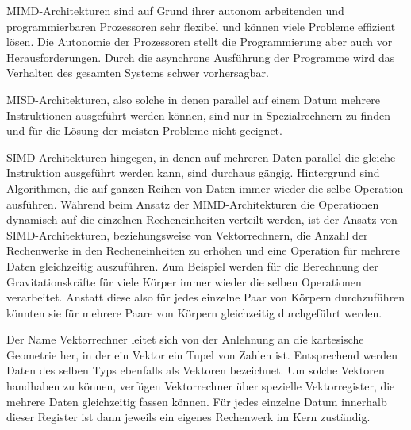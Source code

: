       MIMD-Architekturen sind auf Grund ihrer autonom arbeitenden und programmierbaren Prozessoren sehr flexibel und können viele Probleme effizient lösen. Die Autonomie der Prozessoren
      stellt die Programmierung aber auch vor Herausforderungen. Durch die asynchrone Ausführung der Programme wird das Verhalten des gesamten Systems schwer vorhersagbar.\citep{hpcskript}
      
      MISD-Architekturen, also solche in denen parallel auf einem Datum mehrere Instruktionen ausgeführt werden können, sind nur in Spezialrechnern zu finden und für die Lösung der meisten
      Probleme nicht geeignet. \citep{architect, korbler}
      
      SIMD-Architekturen hingegen, in denen auf mehreren Daten parallel die gleiche Instruktion ausgeführt werden kann, sind durchaus gängig.
      Hintergrund sind Algorithmen, die auf ganzen Reihen von Daten immer wieder die selbe Operation ausführen. Während beim Ansatz der MIMD-Architekturen die Operationen dynamisch auf die
      einzelnen Recheneinheiten verteilt werden, ist der Ansatz von SIMD-Architekturen, beziehungsweise von Vektorrechnern, die Anzahl der Rechenwerke in den Recheneinheiten zu erhöhen 
      und eine Operation für mehrere Daten gleichzeitig auszuführen. Zum Beispiel werden für die Berechnung der Gravitationskräfte für viele Körper immer wieder die selben Operationen 
      verarbeitet. Anstatt diese also für jedes einzelne Paar von Körpern durchzuführen könnten sie für mehrere Paare von Körpern gleichzeitig durchgeführt werden.
      
      Der Name Vektorrechner leitet sich von der Anlehnung an die kartesische Geometrie her, in der ein Vektor ein Tupel von Zahlen ist. Entsprechend werden Daten des selben Typs ebenfalls 
      als Vektoren bezeichnet. Um solche Vektoren handhaben zu können, verfügen Vektorrechner über spezielle Vektorregister, die mehrere Daten gleichzeitig fassen können. Für jedes einzelne
      Datum innerhalb dieser Register ist dann jeweils ein eigenes Rechenwerk im Kern zuständig.\citep{hpcskript}
      
